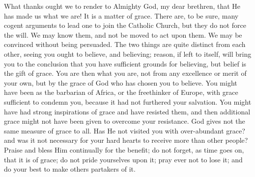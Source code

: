 What thanks ought we to render to Almighty God, my dear brethren,
that He has made us what we are! It is a matter of grace. There are,
to be sure, many cogent arguments to lead one to join the Catholic
Church, but they do not force the will. We may know them, and not be
moved to act upon them. We may be convinced without being persuaded.
The two things are quite distinct from each other, seeing you ought to
believe, and believing; reason, if left to itself, will bring you to
the conclusion that you have sufficient grounds for believing, but
belief is the gift of grace. You are then what you are, not from any
excellence or merit of your own, but by the grace of God who has
chosen you to believe. You might have been as the barbarian of Africa,
or the freethinker of Europe, with grace sufficient to condemn you,
because it had not furthered your salvation. You might have had strong
inspirations of grace and have resisted them, and then additional
grace might not have been given to overcome your resistance. God gives
not the same measure of grace to all. Has He not visited you with
over-abundant grace? and was it not necessary for your hard hearts to
receive more than other people? Praise and bless Him continually for
the benefit; do not forget, as time goes on, that it is of grace; do
not pride yourselves upon it; pray ever not to lose it; and do your
best to make others partakers of it.

